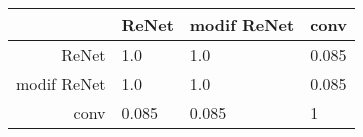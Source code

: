 \begin{tabular}{|r|l|l|l|}
  \hline
    & ReNet & modif ReNet & conv \\
  \hline
  ReNet & 1.0 & 1.0 & 0.085 \\
  \hline
  modif ReNet & 1.0 & 1.0 & 0.085 \\
  \hline
  conv & 0.085 & 0.085 & 1 \\
  \hline
\end{tabular}
